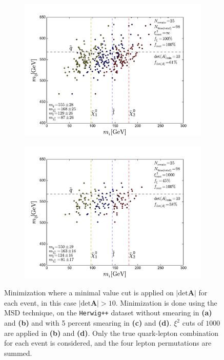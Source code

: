 \documentclass[twoside,english]{uiofysmaster}
\begin{document}
\begin{figure}[hbt]
	\begin{subfigure}[b]{0.45\textwidth}
		\includegraphics[width=\textwidth]{figures/improving_combinatorics/herwigpp-5psmear-4combosum-detAcut_10-xisqcut_none-nocomb-TMP.pdf} 
		\caption{ }
		\label{fig:detAcut_c}
	\end{subfigure}
	\begin{subfigure}[b]{0.45\textwidth}
		\includegraphics[width=\textwidth]{figures/improving_combinatorics/herwigpp-5psmear-4combosum-detAcut_10-xisqcut_1000-nocomb-TMP.pdf}
		\caption{ } 
		\label{fig:detAcut_d}
	\end{subfigure}
	\caption{Minimization where a minimal value cut is applied on $|\mathrm{det}\mathbf A|$ for each event, in this case $|\mathrm{det}\mathbf A|>10$. Minimization is done using the MSD technique, on the {\tt Herwig++} dataset without smearing in {\bf (a)} and {\bf (b)} and with 5 percent smearing in {\bf (c)} and {\bf (d)}. $\xi^2$ cuts of $1000$ are applied in {\bf (b)} and {\bf (d)}. Only the true quark-lepton combination for each event is considered, and the four lepton permutations are summed.}
	\label{fig:detAcut}
\end{figure}
\end{document}
